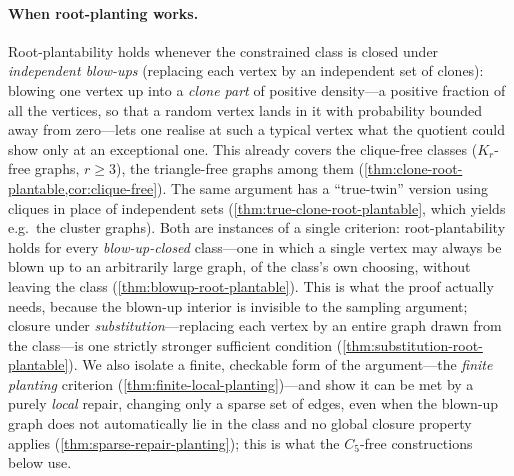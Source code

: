 \documentclass[11pt]{article}
\theoremstyle{definition}
\begin{document}
\paragraph{When root-planting works.}
Root-plantability holds whenever the constrained class is closed under
\emph{independent blow-ups}
(replacing each vertex by an independent set of clones): blowing one vertex up into a
\emph{clone part} of positive density---a positive fraction of all the vertices, so that a
random vertex lands in it with probability bounded away from zero---lets one realise at
such a typical vertex what the quotient could show only at an exceptional one.
This already covers the clique-free classes ($K_r$-free graphs, $r\ge3$), the
triangle-free graphs among them
(\cref{thm:clone-root-plantable,cor:clique-free}).  The same argument has a
``true-twin'' version using cliques in place of independent sets
(\cref{thm:true-clone-root-plantable}, which yields e.g.\ the cluster graphs).  Both are
instances of a single criterion: root-plantability holds for every \emph{blow-up-closed}
class---one in which a single vertex may always be blown up to an arbitrarily large graph,
of the class's own choosing, without leaving the class (\cref{thm:blowup-root-plantable}).
This is what the proof actually needs, because the blown-up interior is invisible to the
sampling argument; closure under \emph{substitution}---replacing each vertex by an entire
graph drawn from the class---is one strictly stronger sufficient condition
(\cref{thm:substitution-root-plantable}).  We also isolate a finite, checkable form of the
argument---the \emph{finite planting} criterion (\cref{thm:finite-local-planting})---and show
it can be met by a purely \emph{local} repair, changing only a sparse set of edges, even when
the blown-up graph does not automatically lie in the class and no global closure property
applies (\cref{thm:sparse-repair-planting}); this is what the $C_5$-free constructions below
use.
\end{document}
